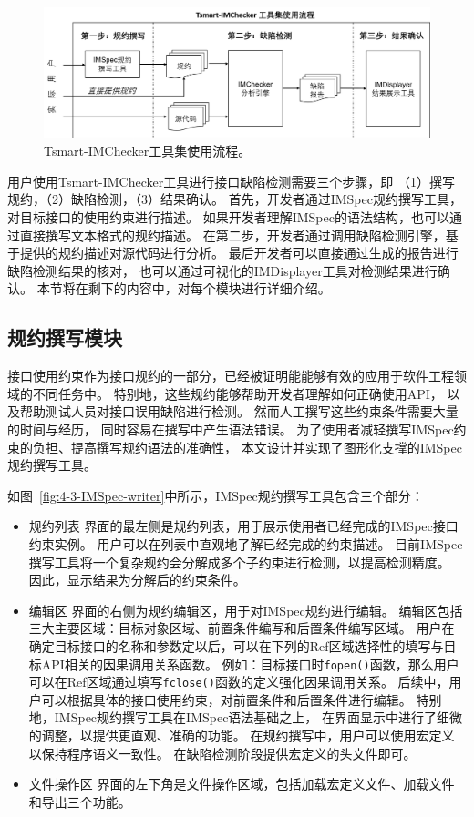 \begin{figure}[t]
	\centering
	\includegraphics[width=0.85\linewidth]{figures/cp4-overview.png}
	\caption{
		Tsmart-IMChecker工具集使用流程。
	}
	\label{fig:4-3-overview}
\end{figure}

用户使用Tsmart-IMChecker工具进行接口缺陷检测需要三个步骤，即
（1）撰写规约，（2）缺陷检测，（3）结果确认。
首先，开发者通过IMSpec规约撰写工具，对目标接口的使用约束进行描述。
如果开发者理解IMSpec的语法结构，也可以通过直接撰写文本格式的规约描述。
在第二步，开发者通过调用缺陷检测引擎，基于提供的规约描述对源代码进行分析。
最后开发者可以直接通过生成的报告进行缺陷检测结果的核对，
也可以通过可视化的IMDisplayer工具对检测结果进行确认。
本节将在剩下的内容中，对每个模块进行详细介绍。



\subsection{规约撰写模块}
接口使用约束作为接口规约的一部分，已经被证明能能够有效的应用于软件工程领域的不同任务中。
特别地，这些规约能够帮助开发者理解如何正确使用API，
以及帮助测试人员对接口误用缺陷进行检测。
然而人工撰写这些约束条件需要大量的时间与经历，
同时容易在撰写中产生语法错误。
为了使用者减轻撰写IMSpec约束的负担、提高撰写规约语法的准确性，
本文设计并实现了图形化支撑的IMSpec规约撰写工具。

如图~\ref{fig:4-3-IMSpec-writer}中所示，IMSpec规约撰写工具包含三个部分：
\begin{itemize}
	\item {\kaishu 规约列表}
	界面的最左侧是规约列表，用于展示使用者已经完成的IMSpec接口约束实例。
	用户可以在列表中直观地了解已经完成的约束描述。
	目前IMSpec撰写工具将一个复杂规约会分解成多个子约束进行检测，以提高检测精度。
	因此，显示结果为分解后的约束条件。
	\item {\kaishu 编辑区} 
	界面的右侧为规约编辑区，用于对IMSpec规约进行编辑。
	编辑区包括三大主要区域：目标对象区域、前置条件编写和后置条件编写区域。
	用户在确定目标接口的名称和参数定以后，可以在下列的Ref区域选择性的填写与目标API相关的因果调用关系函数。
	例如：目标接口时\texttt{fopen()}函数，那么用户可以在Ref区域通过填写\texttt{fclose()}函数的定义强化因果调用关系。
	后续中，用户可以根据具体的接口使用约束，对前置条件和后置条件进行编辑。
	特别地，IMSpec规约撰写工具在IMSpec语法基础之上，
	在界面显示中进行了细微的调整，以提供更直观、准确的功能。
	在规约撰写中，用户可以使用宏定义以保持程序语义一致性。
	在缺陷检测阶段提供宏定义的头文件即可。
	\item {\kaishu 文件操作区} 
	界面的左下角是文件操作区域，包括加载宏定义文件、加载文件和导出三个功能。
	
\end{itemize}

